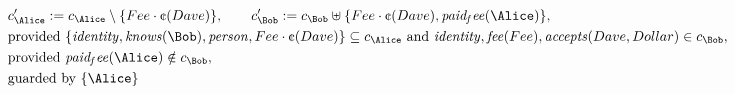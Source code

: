 \begin{align*}
&
c'_
{
\Alice
}
 := 
c_
{
\Alice
}
 \setminus 
\{
Fee
\cdot
\text{\textcent}
(
Dave
)
\}
, \qquad 
c'_
{
\Bob
}
 := 
c_
{
\Bob
}
 \uplus 
\{
Fee
\cdot
\text{\textcent}
(
Dave
)
,
\mathit{
paid_fee
}
(
\Alice
)
\}
,\\
&
\text{provided } 
\{
\mathit{
identity
}
,
\mathit{
knows
}
(
\Bob
)
,
\mathit{
person
}
,
Fee
\cdot
\text{\textcent}
(
Dave
)
\}
 \subseteq c_
{
\Alice
}
 \text{ and } 
\mathit{
identity
}
,
\mathit{
fee
}
(
Fee
)
,
\mathit{
accepts
}
(
Dave
,
Dollar
)
 \in c_
{
\Bob
}
,\\
&
\text{provided } 
\mathit{
paid_fee
}
(
\Alice
)
 \notin c_
{
\Bob
}
,\\
&
\text{guarded by } \{
\Alice
\}
\end{align*}
